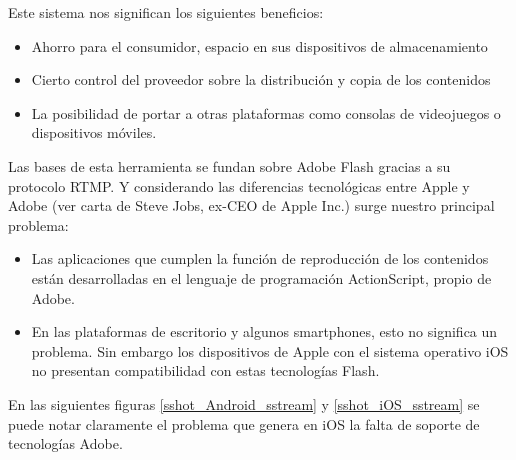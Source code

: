 Este sistema nos significan los siguientes beneficios: 
\begin{itemize}
\item Ahorro para el consumidor, espacio en sus dispositivos de almacenamiento
\item Cierto control del proveedor sobre la distribución  y copia de los contenidos
\item La posibilidad de portar a otras plataformas como consolas de videojuegos o dispositivos móviles.
\end{itemize}

Las bases de esta herramienta se fundan sobre Adobe Flash gracias a su protocolo RTMP. Y considerando las diferencias tecnológicas entre Apple y Adobe (ver \cite{sota:steve-flash} carta de Steve Jobs, ex-CEO de Apple Inc.) surge nuestro principal problema:

\begin{itemize}
\item Las aplicaciones que cumplen la función de reproducción de los contenidos están desarrolladas en el lenguaje de programación ActionScript, propio de Adobe.
\item En las plataformas de escritorio y algunos smartphones, esto no significa un problema. Sin embargo los dispositivos de Apple con el sistema operativo iOS no presentan compatibilidad con estas tecnologías Flash.
\end{itemize}

	En las siguientes figuras \ref{sshot_Android_sstream} y \ref{sshot_iOS_sstream} se puede notar claramente el problema que genera en iOS la falta de soporte de tecnologías Adobe.

